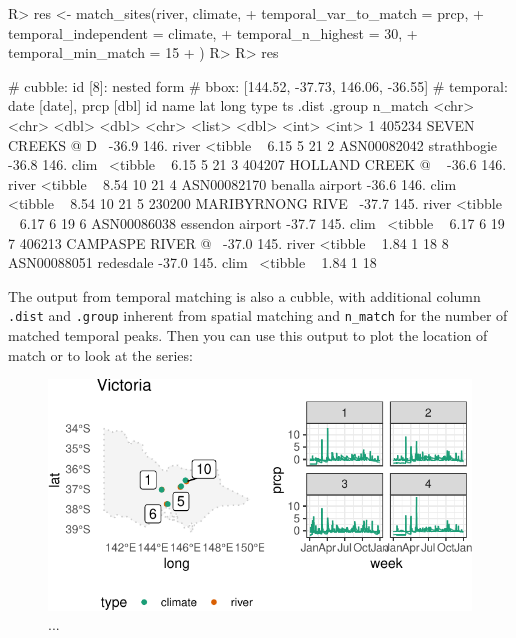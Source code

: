 \documentclass[
]{jss}
\begin{document}
\begin{CodeChunk}
\begin{CodeInput}
R> res <- match_sites(river, climate,
+   temporal_var_to_match = prcp,
+   temporal_independent = climate,  
+   temporal_n_highest = 30,
+   temporal_min_match = 15
+ )
R> 
R> res
\end{CodeInput}
\begin{CodeOutput}
# cubble:   id [8]: nested form
# bbox:     [144.52, -37.73, 146.06, -36.55]
# temporal: date [date], prcp [dbl]
  id          name                lat  long type  ts        .dist .group n_match
  <chr>       <chr>             <dbl> <dbl> <chr> <list>    <dbl>  <int>   <int>
1 405234      SEVEN CREEKS @ D~ -36.9  146. river <tibble ~  6.15      5      21
2 ASN00082042 strathbogie       -36.8  146. clim~ <tibble ~  6.15      5      21
3 404207      HOLLAND CREEK @ ~ -36.6  146. river <tibble ~  8.54     10      21
4 ASN00082170 benalla airport   -36.6  146. clim~ <tibble ~  8.54     10      21
5 230200      MARIBYRNONG RIVE~ -37.7  145. river <tibble ~  6.17      6      19
6 ASN00086038 essendon airport  -37.7  145. clim~ <tibble ~  6.17      6      19
7 406213      CAMPASPE RIVER @~ -37.0  145. river <tibble ~  1.84      1      18
8 ASN00088051 redesdale         -37.0  145. clim~ <tibble ~  1.84      1      18
\end{CodeOutput}
\end{CodeChunk}

The output from temporal matching is also a cubble, with additional
column \texttt{.dist} and \texttt{.group} inherent from spatial matching
and \texttt{n\_match} for the number of matched temporal peaks. Then you
can use this output to plot the location of match or to look at the
series:

\begin{CodeChunk}
\begin{figure}

{\centering \includegraphics[width=1\linewidth]{figures/unnamed-chunk-22-1} 

}

\caption[..]{...}\label{fig:unnamed-chunk-22}
\end{figure}
\end{CodeChunk}
\end{document}
